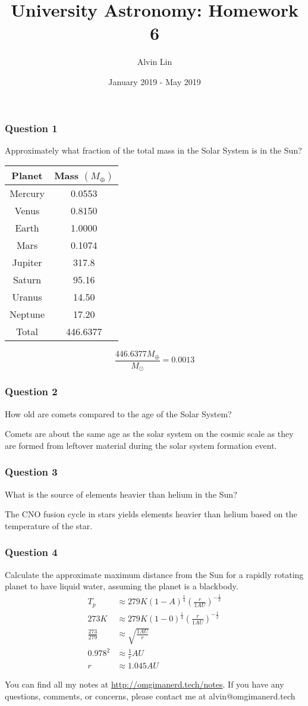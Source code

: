 \documentclass{math}
\title{University Astronomy: Homework 6}
\author{Alvin Lin}
\date{January 2019 - May 2019}
\begin{document}
\maketitle

\subsubsection*{Question 1}
Approximately what fraction of the total mass in the Solar System is in
the Sun? \par
\begin{center}
  \begin{tabular}{|c|c|}
    \hline
    Planet & Mass \( (M_{\oplus}) \) \\
    \hline
    Mercury & 0.0553 \\
    Venus & 0.8150 \\
    Earth & 1.0000 \\
    Mars & 0.1074 \\
    Jupiter & 317.8 \\
    Saturn & 95.16 \\
    Uranus & 14.50 \\
    Neptune & 17.20 \\
    Total & 446.6377 \\
    \hline
  \end{tabular}
\end{center}
\[ \frac{446.6377M_{\oplus}}{M_{\odot}} = 0.0013 \]

\subsubsection*{Question 2}
How old are comets compared to the age of the Solar System? \par
Comets are about the same age as the solar system on the cosmic scale as they
are formed from leftover material during the solar system formation event.

\subsubsection*{Question 3}
What is the source of elements heavier than helium in the Sun? \par
The CNO fusion cycle in stars yields elements heavier than helium based on the
temperature of the star.

\subsubsection*{Question 4}
Calculate the approximate maximum distance from the Sun for a rapidly
rotating planet to have liquid water, assuming the planet is a blackbody.
\begin{align*}
  T_p &\approx 279K(1-A)^{\frac{1}{4}}
    \left(\frac{r}{1AU}\right)^{-\frac{1}{2}} \\
  273K &\approx 279K(1-0)^{\frac{1}{4}}
    \left(\frac{r}{1AU}\right)^{-\frac{1}{2}} \\
  \frac{273}{279} &\approx \sqrt{\frac{1AU}{r}} \\
  0.978^2 &\approx \frac{1}{r}AU \\
  r &\approx 1.045AU
\end{align*}

\begin{center}
  You can find all my notes at \url{http://omgimanerd.tech/notes}. If you have
  any questions, comments, or concerns, please contact me at
  alvin@omgimanerd.tech
\end{center}
\end{document}
